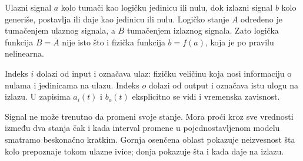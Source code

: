 Ulazni signal $a$ kolo tumači kao logičku jedinicu ili nulu, dok izlazni signal $b$ kolo generiše, postavlja ili daje kao jedinicu ili nulu. Logičko stanje $A$ određeno je tumačenjem ulaznog signala, a $B$ tumačenjem izlaznog signala. Zato logička funkcija $B=\overline A$ nije isto što i fizička funkcija $b=f(a)$, koja je po pravilu nelinearna.

Indeks $i$ dolazi od input i označava ulaz: fizičku veličinu koja nosi informaciju o nulama i jedinicama na ulazu. Indeks $o$ dolazi od output i označava istu ulogu na izlazu. U zapisima $a_i(t)$ i $b_o(t)$ eksplicitno se vidi i vremenska zavisnost.

Signal ne može trenutno da promeni svoje stanje. Mora proći kroz sve vrednosti između dva stanja čak i kada interval promene u pojednostavljenom modelu smatramo beskonačno kratkim. Gornja osenčena oblast pokazuje neizvesnost šta kolo prepoznaje tokom ulazne ivice; donja pokazuje šta i kada daje na izlazu.
